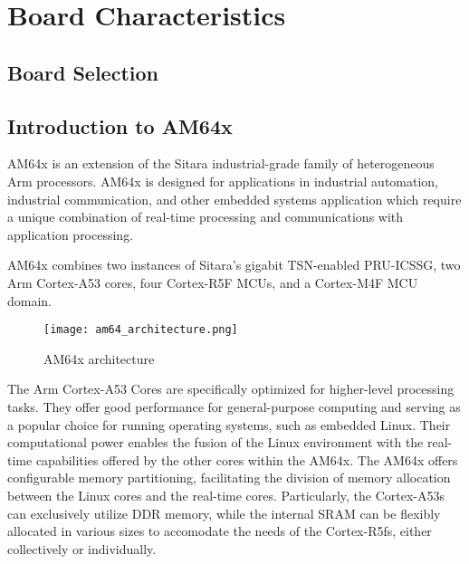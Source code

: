 

\chapter{Board Characteristics}

\section{Board Selection}

\section{Introduction to AM64x}

AM64x is an extension of the Sitara industrial-grade family of heterogeneous
Arm processors. \cite{AM64_datasheet}
AM64x is designed for applications in industrial automation, industrial
communication, and other embedded systems application which require a unique
combination of real-time processing and communications with application
processing. 

AM64x combines two instances of Sitara's gigabit TSN-enabled PRU-ICSSG,
two Arm Cortex-A53 cores, four Cortex-R5F MCUs, and a Cortex-M4F MCU
domain.

\begin{figure}[htb]
    \centering
    \texttt{[image: am64\_architecture.png]}
    \caption{AM64x architecture}
\end{figure}

The Arm Cortex-A53 Cores are specifically optimized for higher-level
processing tasks.
They offer good performance for general-purpose computing and serving as a
popular choice for running operating systems, such as embedded Linux.
Their computational power enables the fusion of the Linux environment with the
real-time capabilities offered by the other cores within the AM64x.
The AM64x offers configurable memory partitioning, facilitating the division
of memory allocation between the Linux cores and the real-time cores.
Particularly, the Cortex-A53s can exclusively utilize DDR memory, while 
the internal SRAM can be flexibly allocated in various sizes to accomodate
the needs of the Cortex-R5fs, either collectively or individually.

